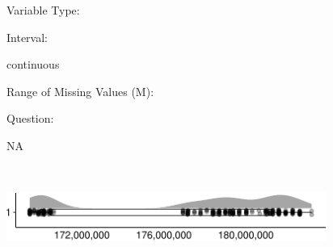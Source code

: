 \documentclass[
]{article}
\begin{document}
\begin{minipage}[t]{0.3\linewidth}

Variable Type:

\end{minipage}%
\begin{minipage}[t]{0.7\linewidth}

\end{minipage}

\begin{minipage}[t]{0.3\linewidth}

Interval:

\end{minipage}%
\begin{minipage}[t]{0.7\linewidth}

continuous

\end{minipage}

\begin{minipage}[t]{0.3\linewidth}

Range of Missing Values (M):

\end{minipage}%
\begin{minipage}[t]{0.7\linewidth}

\end{minipage}

\begin{minipage}[t]{0.3\linewidth}

Question:

\end{minipage}%
\begin{minipage}[t]{0.7\linewidth}

NA

\end{minipage}

\begin{minipage}[t]{0.3\linewidth}

~

\end{minipage}%
\begin{minipage}[t]{0.7\linewidth}

\includegraphics[width=396px]{codebook_template_files/figure-latex/submission_id_rainplot-1}

\end{minipage}
 \vspace*{-6mm} 
\end{document}

